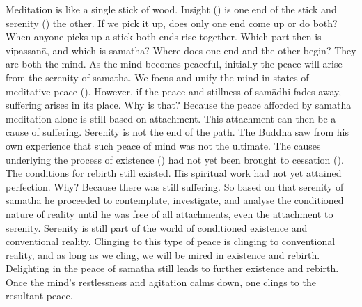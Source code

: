 Meditation is like a single stick of wood. Insight () is one end of the stick and serenity () the other. If we pick it up, does only one end come up or do both? When anyone picks up a stick both ends rise together. Which part then is vipassan\=a, and which is samatha? Where does one end and the other begin? They are both the mind. As the mind becomes peaceful, initially the peace will arise from the serenity of samatha. We focus and unify the mind in states of meditative peace (). However, if the peace and stillness of sam\=adhi fades away, suffering arises in its place. Why is that? Because the peace afforded by samatha meditation alone is still based on attachment. This attachment can then be a cause of suffering. Serenity is not the end of the path. The Buddha saw from his own experience that such peace of mind was not the ultimate. The causes underlying the process of existence () had not yet been brought to cessation (). The conditions for rebirth still existed. His spiritual work had not yet attained perfection. Why? Because there was still suffering. So based on that serenity of samatha he proceeded to contemplate, investigate, and analyse the conditioned nature of reality until he was free of all attachments, even the attachment to serenity. Serenity is still part of the world of conditioned existence and conventional reality. Clinging to this type of peace is clinging to conventional reality, and as long as we cling, we will be mired in existence and rebirth. Delighting in the peace of samatha still leads to further existence and rebirth. Once the mind's restlessness and agitation calms down, one clings to the resultant peace.

